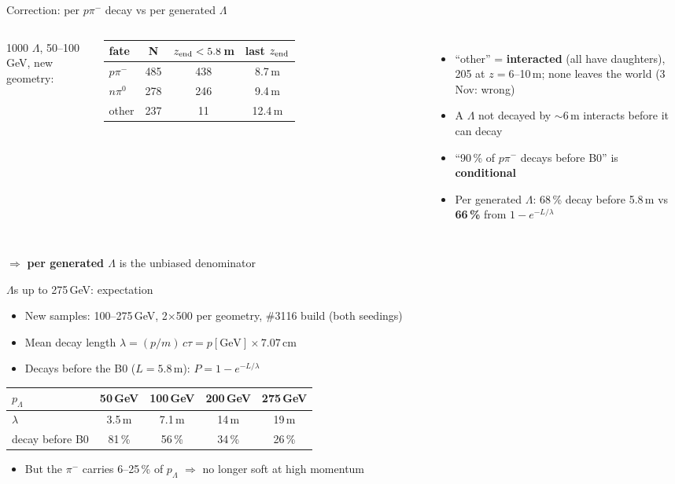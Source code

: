 \documentclass[aspectratio=169,10pt]{beamer}
\newcommand{\good}[1]{\textcolor{green!45!black}{#1}}
\newcommand{\bad}[1]{\textcolor{red!70!black}{#1}}
\begin{document}
\begin{frame}{Correction: per $p\pi^-$ decay vs per generated $\Lambda$}
\begin{columns}[T]
\small
1000 $\Lambda$, 50--100\,GeV, new geometry:\\[1mm]
\begin{tabular}{@{}lccc@{}}
\toprule
fate & N & $z_{\rm end} < 5.8$\,m & last $z_{\rm end}$\\
\midrule
$p\pi^-$ & 485 & 438 & 8.7\,m\\
$n\pi^0$ & 278 & 246 & 9.4\,m\\
other & 237 & 11 & 12.4\,m\\
\bottomrule
\end{tabular}
\begin{itemize}\small
\item ``other'' = \textbf{interacted} (all have daughters), 205 at $z = 6$--10\,m; none leaves the world (3 Nov: wrong)
\item A $\Lambda$ not decayed by $\sim$6\,m interacts before it can decay
\item ``90\,\% of $p\pi^-$ decays before B0'' is \textbf{conditional}
\item Per generated $\Lambda$: 68\,\% decay before 5.8\,m vs \textbf{66\,\%} from $1-e^{-L/\lambda}$
\end{itemize}
\end{columns}
\vspace{3mm}
\centering $\Rightarrow$ \textbf{per generated $\Lambda$} is the unbiased denominator
\end{frame}

\begin{frame}{$\Lambda$s up to 275\,GeV: expectation}
\begin{itemize}
\item New samples: 100--275\,GeV, 2$\times$500 per geometry, \#3116 build (both seedings)
\item Mean decay length $\lambda = (p/m)\,c\tau = p[\text{GeV}] \times 7.07$\,cm
\item Decays before the B0 ($L = 5.8$\,m): $P = 1 - e^{-L/\lambda}$
\end{itemize}
\centering
\begin{tabular}{@{}lcccc@{}}
\toprule
$p_\Lambda$ & 50\,GeV & 100\,GeV & 200\,GeV & 275\,GeV\\
\midrule
$\lambda$ & 3.5\,m & 7.1\,m & 14\,m & 19\,m\\
decay before B0 & 81\,\% & 56\,\% & 34\,\% & \bad{26\,\%}\\
\bottomrule
\end{tabular}
\begin{itemize}
\item But the $\pi^-$ carries 6--25\,\% of $p_\Lambda$ $\Rightarrow$ \good{no longer soft} at high momentum
\end{itemize}
\end{frame}
\end{document}
